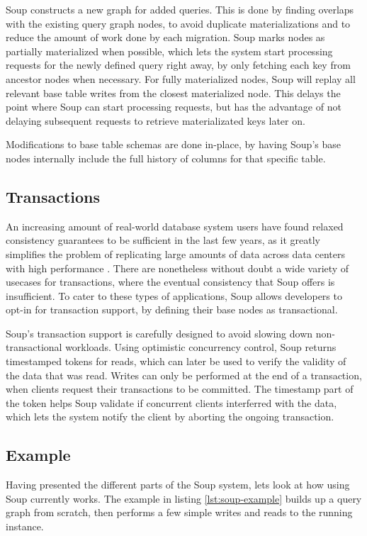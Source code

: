 \documentclass[b5paper]{report}
\begin{document}
Soup constructs a new graph for added queries. This is done by finding overlaps
with the existing query graph nodes, to avoid duplicate materializations and
to reduce the amount of work done by each migration. Soup marks nodes as
partially materialized when possible, which lets the system start processing
requests for the newly defined query right away, by only fetching each key from
ancestor nodes when necessary. For fully materialized nodes, Soup will replay
all relevant base table writes from the closest materialized node. This
delays the point where Soup can start processing requests, but has the advantage
of not delaying subsequent requests to retrieve materializated keys later on.

Modifications to base table schemas are done in-place, by having Soup's base
nodes internally include the full history of columns for that specific table.

\subsection{Transactions}
An increasing amount of real-world database system users have found relaxed
consistency guarantees to be sufficient in the last few years, as it greatly
simplifies the problem of replicating large amounts of data across data centers
with high performance \cite{existential}. There are nonetheless without doubt
a wide variety of usecases for transactions, where the eventual consistency that
Soup offers is insufficient. To cater to these types of applications, Soup
allows developers to opt-in for transaction support, by defining their base
nodes as transactional.

Soup's transaction support is carefully designed to avoid slowing down
non-transactional workloads. Using optimistic concurrency control, Soup returns
timestamped tokens for reads, which can later be used to verify the validity of
the data that was read. Writes can only be performed at the end of a
transaction, when clients request their transactions to be committed. The
timestamp part of the token helps Soup validate if concurrent clients
interferred with the data, which lets the system notify the client by aborting
the ongoing transaction.

\subsection{Example} \label{example}
Having presented the different parts of the Soup system, lets look at how using
Soup currently works. The example in listing \ref{lst:soup-example} builds up a query
graph from scratch, then performs a few simple writes and reads to the running
instance.
\end{document}
